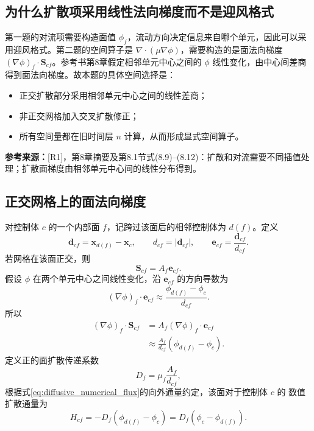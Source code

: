\documentclass[UTF8,12pt,a4paper]{ctexart}
\numberwithin{equation}{section}
\newcommand{\Rone}{\textnormal{[R1]}}
\newcommand{\source}[1]{%
  \par\smallskip
  \noindent\colorbox{sourcebg}{%
    \parbox{0.955\linewidth}{\raggedright\footnotesize\color{sourcegray}\textbf{参考来源：}#1}%
  }
  \par\smallskip
}
\newcommand{\Sf}{\bm S}
\newcommand{\xf}{\bm x}
\newcommand{\ef}{\bm e}
\begin{document}
\subsection{为什么扩散项采用线性法向梯度而不是迎风格式}

第一题的对流项需要构造面值 $\phi_f$，流动方向决定信息来自哪个单元，因此可以采用迎风格式。第二题的空间算子是 $\nabla\cdot(\mu\nabla\phi)$，需要构造的是面法向梯度 $(\nabla\phi)_f\cdot\Sf_{cf}$。参考书第8章假定相邻单元中心之间的 $\phi$ 线性变化，由中心间差商得到面法向梯度。故本题的具体空间选择是：
\begin{itemize}
  \item 正交扩散部分采用相邻单元中心之间的线性差商；
  \item 非正交网格加入交叉扩散修正；
  \item 所有空间量都在旧时间层 $n$ 计算，从而形成显式空间算子。
\end{itemize}

\source{\Rone，第8章摘要及第8.1节式(8.9)--(8.12)：扩散和对流需要不同插值处理；扩散面梯度由相邻单元中心间的线性分布得到。}

\subsection{正交网格上的面法向梯度}

对控制体 $c$ 的一个内部面 $f$，记跨过该面后的相邻控制体为 $d(f)$。定义
\begin{equation}
  \bm d_{cf}=\xf_{d(f)}-\xf_c,
  \qquad
  d_{cf}=|\bm d_{cf}|,
  \qquad
  \ef_{cf}=\frac{\bm d_{cf}}{d_{cf}}.
  \label{eq:center_vector}
\end{equation}
若网格在该面正交，则
\begin{equation}
  \Sf_{cf}=A_f\ef_{cf}.
  \label{eq:orthogonal_area_vector}
\end{equation}
假设 $\phi$ 在两个单元中心之间线性变化，沿 $\ef_{cf}$ 的方向导数为
\begin{equation}
  (\nabla\phi)_f\cdot\ef_{cf}
  \approx\frac{\phi_{d(f)}-\phi_c}{d_{cf}}.
  \label{eq:normal_difference}
\end{equation}
所以
\begin{align}
  (\nabla\phi)_f\cdot\Sf_{cf}
  &=A_f(\nabla\phi)_f\cdot\ef_{cf}
    \label{eq:orth_grad_1}\\
  &\approx\frac{A_f}{d_{cf}}(\phi_{d(f)}-\phi_c).
    \label{eq:orth_grad_2}
\end{align}
定义正的面扩散传递系数
\begin{equation}
  \boxed{D_f=\mu_f\frac{A_f}{d_{cf}}},
  \label{eq:D_orth}
\end{equation}
根据式\eqref{eq:diffusive_numerical_flux}的向外通量约定，该面对于控制体 $c$ 的
数值扩散通量为
\begin{equation}
  \boxed{
  H_{cf}=-D_f(\phi_{d(f)}-\phi_c)
  =D_f(\phi_c-\phi_{d(f)})}.
  \label{eq:orth_face_contribution}
\end{equation}
\end{document}
